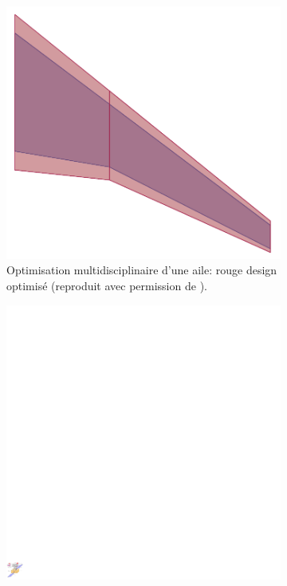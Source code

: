 \documentclass[12pt, french]{article}
\begin{document}
	\begin{figure}[t]
		\begin{subfigure}[t]{0.3\textwidth}
			\includegraphics[width=\columnwidth]{MDo_wing.png}%
			\caption{Optimisation multidisciplinaire d'une aile: rouge design optimisé (reproduit avec permission de \cite{masColomer2021mdo}). }
			\label{fig:wing}
		\end{subfigure}\hfill
		\begin{subfigure}[t]{0.3\textwidth}
			\includegraphics[width=\columnwidth]{Codesign_satellite.pdf} 

\end{subfigure}
\end{figure}
\end{document}
